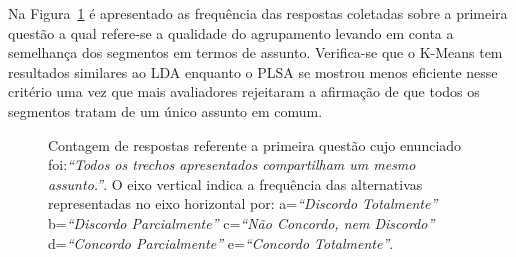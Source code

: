 Na Figura~\ref{fig:Q1} é apresentado as frequência das respostas coletadas sobre a primeira questão a qual refere-se a qualidade do agrupamento levando em conta a semelhança dos segmentos em termos de assunto. Verifica-se que o K-Means tem resultados similares ao LDA enquanto o PLSA se mostrou menos eficiente nesse critério uma vez que mais avaliadores rejeitaram a afirmação de que todos os segmentos tratam de um único assunto em comum. 

\begin{figure}[!h] \centering     %

	\caption{Contagem de respostas referente a primeira questão cujo enunciado foi:\textit{``Todos os trechos apresentados compartilham um mesmo assunto.''}. O eixo vertical indica a frequência das alternativas representadas no eixo horizontal por:
		a=\textit{``Discordo Totalmente''}
		b=\textit{``Discordo Parcialmente''}
		c=\textit{``Não Concordo, nem Discordo''}
		d=\textit{``Concordo Parcialmente''}
		e=\textit{``Concordo Totalmente''}.
	}
	\label{fig:Q1}
\end{figure}



